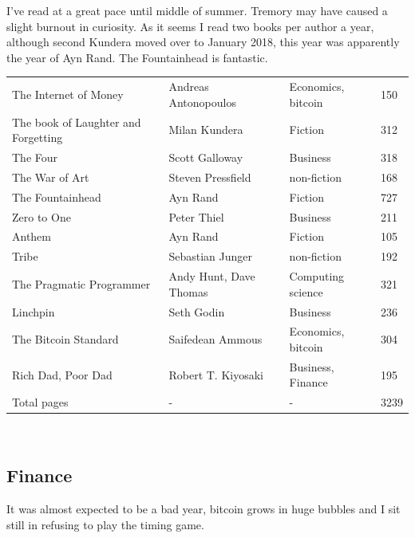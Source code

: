 \documentclass[a4paper]{article}
\begin{document}
I've read at a great pace until middle of summer. Tremory may have caused a slight burnout in curiosity. 
As it seems I read two books per author a year, although second Kundera moved over to January 2018, 
this year was apparently the year of Ayn Rand. The Fountainhead is fantastic. 

\begin{tabular}{l|l|l|l}
The Internet of Money & Andreas Antonopoulos & Economics, bitcoin & 150 \\
The book of Laughter and Forgetting & Milan Kundera & Fiction & 312 \\
The Four & Scott Galloway & Business & 318 \\
The War of Art & Steven Pressfield & non-fiction & 168 \\
The Fountainhead & Ayn Rand & Fiction & 727 \\
Zero to One & Peter Thiel & Business & 211 \\
Anthem & Ayn Rand & Fiction & 105 \\
Tribe & Sebastian Junger & non-fiction & 192 \\
The Pragmatic Programmer & Andy Hunt, Dave Thomas & Computing science & 321 \\
Linchpin & Seth Godin & Business & 236 \\
The Bitcoin Standard & Saifedean Ammous & Economics, bitcoin & 304 \\
Rich Dad, Poor Dad & Robert T. Kiyosaki & Business, Finance & 195 \\ 

Total pages & - & - & 3239
\end{tabular} \\

\subsection{Finance}

It was almost expected to be a bad year, bitcoin grows in huge bubbles and I sit still in refusing to play the timing game.
\end{document}
